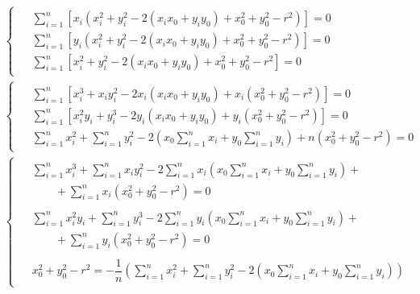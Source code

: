 \begin{align}
    \nonumber
    &\begin{cases}
         \begin{aligned}
             &\sum_{i=1}^{n} \left[ x_i \left(
             x_i^2 + y_i^2 - 2 (x_i x_0 + y_i y_0) + x_0^2 + y_0^2 - r^2 \right) \right] = 0 \\
             &\sum_{i=1}^{n} \left[ y_i \left(
             x_i^2 + y_i^2 - 2 (x_i x_0 + y_i y_0) + x_0^2 + y_0^2 - r^2 \right) \right] = 0 \\
             &\sum_{i=1}^{n} \left[
             x_i^2 + y_i^2 - 2 (x_i x_0 + y_i y_0) + x_0^2 + y_0^2 - r^2 \right] = 0
         \end{aligned}
    \end{cases} \\ \nonumber
    &\begin{cases}
         \begin{aligned}
             &\sum_{i=1}^{n} \left[
             x_i^3 + x_i y_i^2 - 2 x_i (x_i x_0 + y_i y_0)
             + x_i \left( x_0^2 + y_0^2 - r^2 \right) \right] = 0 \\
             &\sum_{i=1}^{n} \left[
             x_i^2 y_i + y_i^3 - 2 y_i (x_i x_0 + y_i y_0)
             + y_i \left( x_0^2 + y_0^2 - r^2 \right) \right] = 0 \\
             &\sum_{i=1}^{n} x_i^2 + \sum_{i=1}^{n} y_i^2
             - 2 \left( x_0 \sum_{i=1}^{n} x_i + y_0 \sum_{i=1}^{n} y_i \right)
             + n \left( x_0^2 + y_0^2 - r^2 \right) = 0
         \end{aligned}
    \end{cases} \\
    &\begin{cases}
         \label{eq:FindDetail:Circle_MNK_full_system}
         \begin{aligned}
             &\sum_{i=1}^{n} x_i^3 + \sum_{i=1}^{n} x_i y_i^2
             - 2 \sum_{i=1}^{n} x_i \left( x_0 \sum_{i=1}^{n} x_i + y_0 \sum_{i=1}^{n} y_i \right) + \\
             &\qquad + \sum_{i=1}^{n} x_i \left( x_0^2 + y_0^2 - r^2 \right) = 0 \\
             \\
             &\sum_{i=1}^{n} x_i^2 y_i + \sum_{i=1}^{n} y_i^3
             - 2 \sum_{i=1}^{n} y_i \left( x_0 \sum_{i=1}^{n} x_i + y_0 \sum_{i=1}^{n} y_i \right) + \\
             &\qquad + \sum_{i=1}^{n} y_i \left( x_0^2 + y_0^2 - r^2 \right) = 0 \\
             \\
             &x_0^2 + y_0^2 - r^2 = - \dfrac{1}{n} \left(
             \sum_{i=1}^{n} x_i^2 + \sum_{i=1}^{n} y_i^2
             - 2 \left( x_0 \sum_{i=1}^{n} x_i
             + y_0 \sum_{i=1}^{n} y_i \right)\right)
         \end{aligned}
    \end{cases}
\end{align} \\

